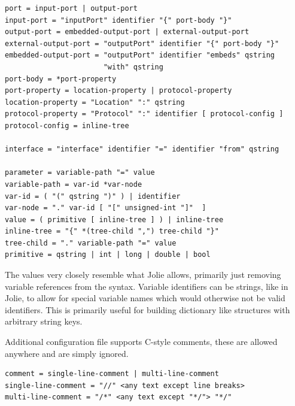 \begin{verbatim}
port = input-port | output-port
input-port = "inputPort" identifier "{" port-body "}"
output-port = embedded-output-port | external-output-port
external-output-port = "outputPort" identifier "{" port-body "}"
embedded-output-port = "outputPort" identifier "embeds" qstring
                       "with" qstring
port-body = *port-property
port-property = location-property | protocol-property
location-property = "Location" ":" qstring
protocol-property = "Protocol" ":" identifier [ protocol-config ]
protocol-config = inline-tree

interface = "interface" identifier "=" identifier "from" qstring

parameter = variable-path "=" value
variable-path = var-id *var-node
var-id = ( "(" qstring ")" ) | identifier
var-node = "." var-id [ "[" unsigned-int "]"  ]
value = ( primitive [ inline-tree ] ) | inline-tree
inline-tree = "{" *(tree-child ",") tree-child "}"
tree-child = "." variable-path "=" value
primitive = qstring | int | long | double | bool
\end{verbatim}

The values very closely resemble what Jolie allows, primarily just removing
variable references from the syntax. Variable identifiers can be strings, like
in Jolie, to allow for special variable names which would otherwise not be
valid identifiers. This is primarily useful for building dictionary like
structures with arbitrary string keys.

Additional configuration file supports C-style comments, these are allowed
anywhere and are simply ignored.

\begin{verbatim}
comment = single-line-comment | multi-line-comment
single-line-comment = "//" <any text except line breaks>
multi-line-comment = "/*" <any text except "*/"> "*/"
\end{verbatim}


